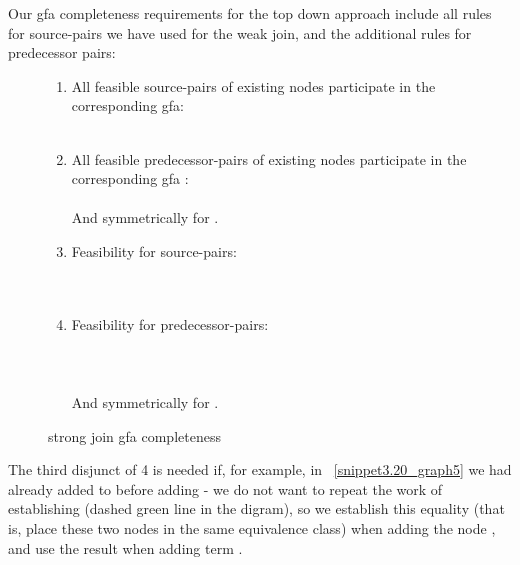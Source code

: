 Our gfa completeness requirements for the top down approach include all rules for source-pairs we have used for the weak join, 
and the additional rules for predecessor pairs:

\begin{figure}
\begin{enumerate}
	\item All feasible source-pairs of existing nodes participate in the corresponding gfa:\\
	\\
	\item All feasible predecessor-pairs of existing nodes participate in the corresponding gfa :\\
	\\
	And symmetrically for .
	\item Feasibility for source-pairs:\\
	\\
	\\
	\item Feasibility for predecessor-pairs:\\
	\\
	\\
	\\
	And symmetrically for .
\end{enumerate}
\caption{strong join gfa completeness}
\label{strong_join_gfa_completeness}
\end{figure}

The third disjunct of 4 is needed if, for example, in ~\ref{snippet3.20_graph5} we had already added  to  before 
adding  - we do not want to repeat the work of establishing  (dashed green line in the digram), so we establish this equality (that is, place these two nodes in the same  equivalence class) when adding the node , and use the result when adding term
.

